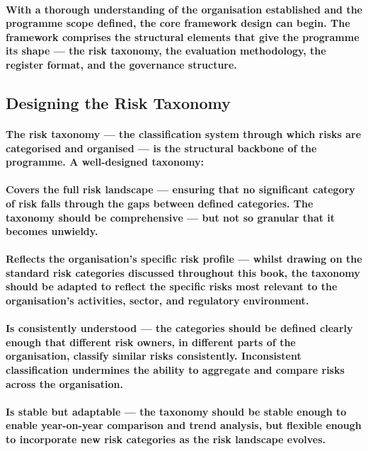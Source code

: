 \paragraph{With a thorough understanding of the organisation established and the programme scope defined, the core framework design can begin. The framework comprises the structural elements that give the programme its shape — the risk taxonomy, the evaluation methodology, the register format, and the governance structure.}

\subsection{Designing the Risk Taxonomy}
\paragraph{The risk taxonomy — the classification system through which risks are categorised and organised — is the structural backbone of the programme. A well-designed taxonomy:}
\paragraph{\textbf{Covers the full risk landscape} — ensuring that no significant category of risk falls through the gaps between defined categories. The taxonomy should be comprehensive — but not so granular that it becomes unwieldy.}
\paragraph{\textbf{Reflects the organisation's specific risk profile} — whilst drawing on the standard risk categories discussed throughout this book, the taxonomy should be adapted to reflect the specific risks most relevant to the organisation's activities, sector, and regulatory environment.}
\paragraph{\textbf{Is consistently understood} — the categories should be defined clearly enough that different risk owners, in different parts of the organisation, classify similar risks consistently. Inconsistent classification undermines the ability to aggregate and compare risks across the organisation.}
\paragraph{\textbf{Is stable but adaptable — the taxonomy should be stable enough to enable year-on-year comparison and trend analysis, but flexible enough to incorporate new risk categories as the risk landscape evolves.}}
